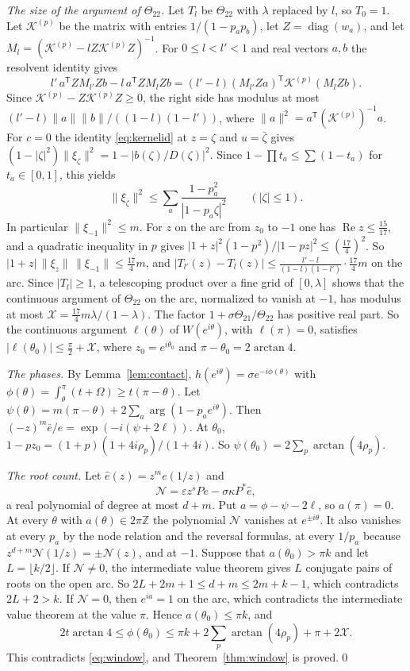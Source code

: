 \documentclass[11pt]{amsart}
\theoremstyle{definition}
\theoremstyle{remark}
\numberwithin{equation}{section}
\newcommand{\Z}{\mathbb Z}
\newcommand{\cK}{\mathcal K}
\begin{document}
\emph{The size of the argument of $\Theta_{22}$.} Let $T_l$ be $\Theta_{22}$ with $\lambda$ replaced by $l$, so
$T_0=1$. Let $\cK^{(p)}$ be the matrix with entries $1/(1-p_ap_b)$, let $Z=\operatorname{diag}(w_a)$, and let
$M_l=(\cK^{(p)}-lZ\cK^{(p)}Z)^{-1}$. For $0\le l<l'<1$ and real vectors $a,b$ the resolvent identity gives
\[
 l'\,a^{\mathsf T}ZM_{l'}Zb-l\,a^{\mathsf T}ZM_lZb=(l'-l)(M_{l'}Za)^{\mathsf T}\cK^{(p)}(M_lZb) .
\]
Since $\cK^{(p)}-Z\cK^{(p)}Z\ge0$, the right side has modulus at most $(l'-l)\|a\|\|b\|/((1-l)(1-l'))$, where
$\|a\|^2=a^{\mathsf T}(\cK^{(p)})^{-1}a$. For $c=0$ the identity \eqref{eq:kernelid} at $z=\zeta$ and $u=\bar\zeta$ gives
$(1-|\zeta|^2)\|\xi_\zeta\|^2=1-|b(\zeta)/D(\zeta)|^2$. Since $1-\prod t_a\le\sum(1-t_a)$ for $t_a\in[0,1]$, this yields
\[
 \|\xi_\zeta\|^2\le\sum_a\frac{1-p_a^2}{|1-p_a\zeta|^2}\qquad(|\zeta|\le1).
\]
In particular $\|\xi_{-1}\|^2\le m$. For $z$ on the arc from $z_0$ to $-1$ one has $\operatorname{Re}z\le\frac{15}{17}$,
and a quadratic inequality in $p$ gives $|1+z|^2(1-p^2)/|1-pz|^2\le(\frac{17}4)^2$. So
$|1+z|\,\|\xi_z\|\,\|\xi_{-1}\|\le\frac{17}4m$, and
$|T_{l'}(z)-T_l(z)|\le\frac{l'-l}{(1-l)(1-l')}\cdot\frac{17}4m$ on the arc. Since $|T_l|\ge1$, a telescoping product
over a fine grid of $[0,\lambda]$ shows that the continuous argument of $\Theta_{22}$ on the arc, normalized to vanish
at $-1$, has modulus at most $\mathcal X=\frac{17}4m\lambda/(1-\lambda)$. The factor $1+\sigma\Theta_{21}/\Theta_{22}$ has
positive real part. So the continuous argument $\ell(\theta)$ of $W(e^{i\theta})$, with $\ell(\pi)=0$, satisfies
$|\ell(\theta_0)|\le\frac\pi2+\mathcal X$, where $z_0=e^{i\theta_0}$ and $\pi-\theta_0=2\arctan4$.

\emph{The phases.} By Lemma~\ref{lem:contact}, $h(e^{i\theta})=\sigma e^{-i\phi(\theta)}$ with
$\phi(\theta)=\int_\theta^\pi(t+\Omega)\ge t(\pi-\theta)$. Let
$\psi(\theta)=m(\pi-\theta)+2\sum_a\arg(1-p_ae^{i\theta})$. Then $(-z)^m\bar e/e=\exp(-i(\psi+2\ell))$. At $\theta_0$,
$1-pz_0=(1+p)(1+4i\rho_p)/(1+4i)$. So $\psi(\theta_0)=2\sum_p\arctan(4\rho_p)$.

\emph{The root count.} Let $\hat e(z)=z^me(1/z)$ and
\[
 \mathcal N=\varepsilon z^sPe-\sigma\kappa P^*\hat e,
\]
a real polynomial of degree at most $d+m$. Put $a=\phi-\psi-2\ell$, so $a(\pi)=0$. At every $\theta$ with
$a(\theta)\in2\pi\Z$ the polynomial $\mathcal N$ vanishes at $e^{\pm i\theta}$. It also vanishes at every $p_a$ by the
node relation and the reversal formulas, at every $1/p_a$ because $z^{d+m}\mathcal N(1/z)=\pm\mathcal N(z)$, and at $-1$. Suppose
that $a(\theta_0)>\pi k$ and let $L=\lfloor k/2\rfloor$. If $\mathcal N\ne0$, the intermediate value theorem gives $L$
conjugate pairs of roots on the open arc. So $2L+2m+1\le d+m\le2m+k-1$, which contradicts $2L+2>k$. If
$\mathcal N=0$, then $e^{ia}=1$ on the arc, which contradicts the intermediate value theorem at the value $\pi$.
Hence $a(\theta_0)\le\pi k$, and
\[
 2t\arctan4\le\phi(\theta_0)\le\pi k+2\sum_p\arctan(4\rho_p)+\pi+2\mathcal X .
\]
This contradicts \eqref{eq:window}, and Theorem~\ref{thm:window} is proved.\qed
\end{document}
